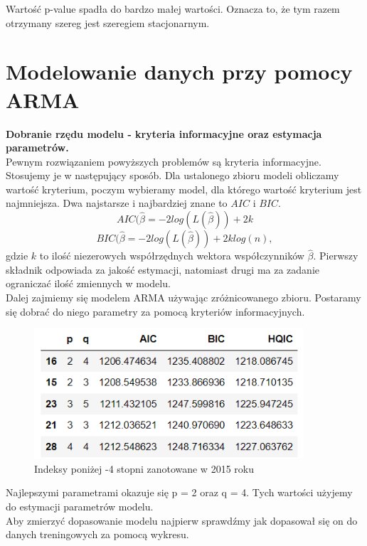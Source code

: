 \documentclass[12pt]{mwart}
\begin{document}
Wartość p-value spadła do bardzo małej wartości. Oznacza to, że tym razem otrzymany szereg jest szeregiem stacjonarnym.





\newpage
\section{Modelowanie danych przy pomocy ARMA}
\textbf{Dobranie rzędu modelu - kryteria informacyjne oraz estymacja parametrów.}\\
Pewnym rozwiązaniem powyższych problemów są kryteria
informacyjne. Stosujemy je w następujący sposób. Dla ustalonego
zbioru modeli obliczamy wartość kryterium, poczym wybieramy
model, dla którego wartość kryterium jest najmniejsza. Dwa
najstarsze i najbardziej znane to $AIC$ i $BIC$.\\

$$AIC(\widehat{\beta} = -2 log(L(\widehat{\beta})) + 2k$$
$$BIC(\widehat{\beta} = -2 log(L(\widehat{\beta})) + 2klog(n),$$
gdzie $k$ to ilość niezerowych współrzędnych wektora
współczynników $\widehat{\beta}$. Pierwszy składnik odpowiada za jakość
estymacji, natomiast drugi ma za zadanie ograniczać ilość
zmiennych w modelu.\\
 Dalej zajmiemy się modelem ARMA używając zróżnicowanego zbioru. Postaramy się dobrać do niego parametry za pomocą kryteriów informacyjnych.\\
 
 \begin{figure}[h]
 	
 	\includegraphics[width=10cm]{kryteria.png}
 	\caption{Indeksy poniżej -4 stopni zanotowane w 2015 roku}
 	
 \end{figure}

Najlepszymi parametrami okazuje się p = 2 oraz q = 4. Tych wartości użyjemy do estymacji parametrów modelu.\\
\newpage
Aby zmierzyć dopasowanie modelu najpierw sprawdźmy jak dopasował się on do danych treningowych za pomocą wykresu.\\
\end{document}
